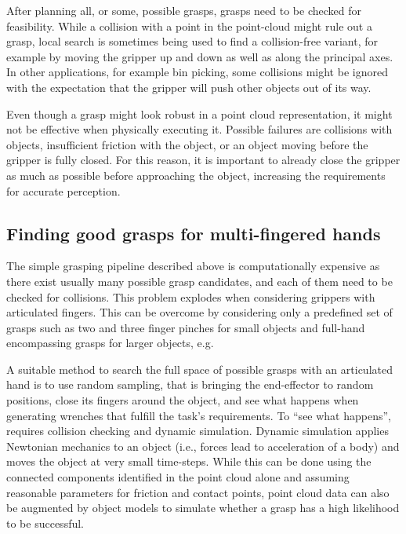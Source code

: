 After planning all, or some, possible grasps, grasps need to be checked for feasibility. While a collision with a point in the point-cloud might rule out a grasp, local search is sometimes being used to find a collision-free variant, for example by moving the gripper up and down as well as along the principal axes. In other applications, for example bin picking, some collisions might be ignored with the expectation that the gripper will push other objects out of its way. 

Even though a grasp might look robust in a point cloud representation, it might not be effective when physically executing it. Possible failures are collisions with objects, insufficient friction with the object, or an object moving before the gripper is fully closed. For this reason, it is important to already close the gripper as much as possible before approaching the object, increasing the requirements for accurate perception. 


\subsection{Finding good grasps for multi-fingered hands}

The simple grasping pipeline described above is computationally expensive as there exist usually many possible grasp candidates, and each of them need to be checked for collisions. This problem explodes when considering grippers with articulated fingers. This can be overcome by considering only a predefined set of grasps such as two and three finger pinches for small objects and full-hand encompassing grasps for larger objects, e.g.

A suitable method to search the full space of possible grasps with an articulated hand is to use random sampling, that is bringing the end-effector to random positions, close its fingers around the object, and see what happens when generating wrenches that fulfill the task's requirements.
To ``see what happens'', requires collision checking and dynamic simulation. Dynamic simulation applies Newtonian mechanics to an object (i.e., forces lead to acceleration of a body) and moves the object at very small time-steps. While this can be done using the connected components identified in the point cloud alone and assuming reasonable parameters for friction and contact points, point cloud data can also be augmented by object models to simulate whether a grasp has a high likelihood to be successful. 

